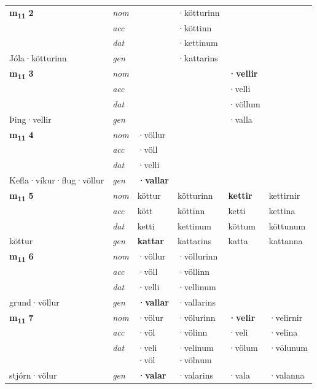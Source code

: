 \begin{longtable}[l]{X>{\footnotesize\itshape}XXXXX}
\multirow{3}{*}{{{\textbf{m{\textsubscript{11}}} \Large{\textbf{2}}}}} & nom &  & ·kötturinn & \textbf{} &  \\*
 & acc &  & ·köttinn &  &  \\*
 & dat &  & ·kettinum &  &  \\*
 {\footnotesize{Jóla\allowbreak ·kötturinn}} & gen & \textbf{} & ·kattarins &  &  \\
\midrule

\multirow{3}{*}{{{\textbf{m{\textsubscript{11}}} \Large{\textbf{3}}}}} & nom &  &  & \textbf{·vellir} &  \\*
 & acc &  &  & ·velli &  \\*
 & dat &  &  & ·völlum &  \\*
 {\footnotesize{Þing\allowbreak ·vellir}} & gen & \textbf{} &  & ·valla &  \\
\midrule

\multirow{3}{*}{{{\textbf{m{\textsubscript{11}}} \Large{\textbf{4}}}}} & nom & ·völlur &  & \textbf{} &  \\*
 & acc & ·völl &  &  &  \\*
 & dat & ·velli &  &  &  \\*
 {\footnotesize{Kefla\allowbreak ·víkur\allowbreak ·flug\allowbreak ·völlur}} & gen & \textbf{·vallar} &  &  &  \\
\midrule

\multirow{3}{*}{{{\textbf{m{\textsubscript{11}}} \Large{\textbf{5}}}}} & nom & köttur & kötturinn & \textbf{kettir} & kettirnir \\*
 & acc & kött & köttinn & ketti & kettina \\*
 & dat & ketti & kettinum & köttum & köttunum \\*
 {\footnotesize{köttur}} & gen & \textbf{kattar} & kattarins & katta & kattanna \\
\midrule

\multirow{3}{*}{{{\textbf{m{\textsubscript{11}}} \Large{\textbf{6}}}}} & nom & ·völlur & ·völlurinn & \textbf{} &  \\*
 & acc & ·völl & ·völlinn &  &  \\*
 & dat & ·velli & ·vellinum &  &  \\*
 {\footnotesize{grund\allowbreak ·völlur}} & gen & \textbf{·vallar} & ·vallarins &  &  \\
\midrule

\multirow{3}{*}{{{\textbf{m{\textsubscript{11}}} \Large{\textbf{7}}}}} & nom & ·völur & ·völurinn & \textbf{·velir} & ·velirnir \\*
 & acc & ·völ & ·völinn & ·veli & ·velina \\*
 & dat & \specialcell{·veli\\  ·völ} & \specialcell{·velinum\\  ·völnum} & ·völum & ·völunum \\*
 {\footnotesize{stjórn\allowbreak ·völur}} & gen & \textbf{·valar} & ·valarins & ·vala & ·valanna \\
\midrule


\end{longtable}

